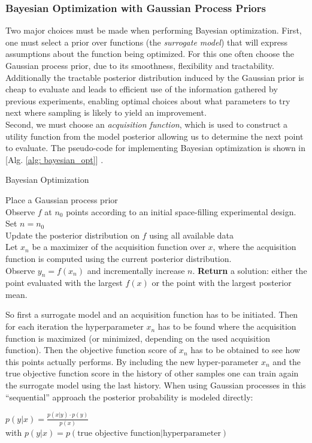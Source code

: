 \documentclass[12pt, a4paper]{article}
\begin{document}
\subsubsection{Bayesian Optimization with Gaussian Process Priors}
Two major choices must be made when performing Bayesian optimization. First, one must select a prior over functions (the \textit{surrogate model}) that will express assumptions about the function being optimized. For this one often choose the Gaussian process prior, due to its smoothness, flexibility and tractability. Additionally the tractable posterior distribution induced by the Gaussian prior is cheap to evaluate and leads to efficient use of the information gathered by previous experiments, enabling optimal choices about what parameters to try next \cite{Snoek2012} where sampling is likely to yield an improvement. \\
Second, we must choose an \textit{acquisition function}, which is used to construct a utility function from the model posterior allowing us to determine the next point to evaluate. The pseudo-code for implementing Bayesian optimization is shown in [Alg. \ref{alg: bayesian_opt}] \cite{Frazier2018}.
\begin{algorithm}
\caption{Bayesian Optimization \cite{Frazier2018}}
    \label{alg: bayesian_opt}
    Place a Gaussian process prior \\
    Observe $f$ at $n_0$ points according to an initial space-filling experimental design. \\
    Set $n = n_0$ \\
    {
    Update the posterior distribution on $f$ using all available data \\
    Let $x_n$ be a maximizer of the acquisition function over $x$, where the acquisition function is computed using the current posterior distribution.\\
    Observe $y_n = f(x_n)$ and incrementally increase $n$.
    }
    \textbf{Return} a solution: either the point evaluated with the largest $f(x)$ or the point with the largest posterior mean.
\end{algorithm}
\newpage
So first a surrogate model and an acquisition function has to be initiated. Then for each iteration the hyperparameter $x_n$ has to be found where the acquisition function is maximized (or minimized, depending on the used acquisition function). Then the objective function score of $x_n$ has to be obtained to see how this points actually performs. By including the new hyper-parameter $x_n$ and the true objective function score in the history of other samples one can train again the surrogate model using the last history.
When using Gaussian processes in this ``sequential'' approach the posterior probability is modeled directly:
\begin{center}
    $p(y|x) = \frac{p(x|y) \cdot p(y)}{p(x)}$ \\
    with $ p(y|x) = p(\text{true objective function} | \text{hyperparameter})$
\end{center}
\end{document}
